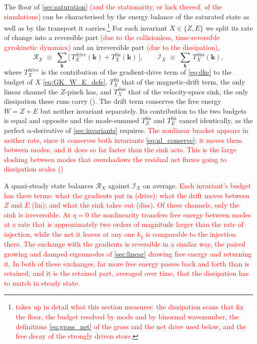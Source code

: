 \documentclass{jpp}
\renewcommand{\vec}[1]{\boldsymbol{#1}}
\newcommand{\vec}[1]{\boldsymbol{#1}}
\begin{document}
The floor of \cref{sec:saturation} \textcolor{red}{(and the stationarity, or lack thereof, of the simulations)} can be characterised by the energy balance of the saturated state as well as by the transport it carries.\footnote{\textcolor{red}{ takes up in detail what this section measures: the dissipation scans that fix the floor, the budget resolved by mode and by binormal wavenumber, the definitions \cref{eq:gross_net} of the gross and the net drive used below, and the free decay of the strongly driven store.}} For each invariant $X \in \{Z, E\}$ we split its rate of change into a reversible part \textcolor{red}{(due to the collisionless, time-reversible gyrokinetic dynamics)} and an irreversible part \textcolor{red}{(due to the dissipation)},
\begin{equation}\label{eq:rev_irr}
\mathcal{R}_X \;\equiv\; \sum_{\vec k}\bigl[\,T_X^\mathrm{drive}(\vec k) + T_X^\mathrm{lin}(\vec k)\,\bigr],
\qquad
\mathcal{I}_X \;\equiv\; \sum_{\vec k}\,T_X^\mathrm{diss}(\vec k),
\end{equation}
where $T_X^\mathrm{drive}$ is the contribution of the gradient-drive term of \cref{eq:dke} to the budget of $X$ \cref{eq:GK_W_E_defs}, $T_X^\mathrm{lin}$ that of the magnetic-drift term, the only linear channel the $Z$-pinch has, and $T_X^\mathrm{diss}$ that of the velocity-space sink, the only dissipation these runs carry (). The drift term conserves the free energy $W = Z + E$ but neither invariant separately. Its contribution to the two budgets is equal and opposite and the mode-summed $T_Z^\mathrm{lin}$ and $T_E^\mathrm{lin}$ cancel identically, as the perfect $\alpha$-derivative of \cref{sec:invariants} requires. \textcolor{red}{The nonlinear bracket appears in neither rate, since it conserves both invariants \cref{eq:nl_conserve}; it moves them between modes, and it does so far faster than the sink acts. This is the large sloshing between modes that overshadows the residual net fluxes going to dissipation scales ()} 

A quasi-steady state balances $\mathcal{R}_X$ against $\mathcal{I}_X$ on average. \textcolor{red}{Each invariant's budget has three terms: what the gradients put in (drive); what the drift moves between $Z$ and $E$ (lin); and what the sink takes out (diss). Of these channels, only the sink is irreversible. At $\eta = 0$ the nonlinearity transfers free energy between modes at a rate that is approximately two orders of magnitude larger than the rate of injection, while the net it leaves at any one $k_y$ is comparable to the injection there. The exchange with the gradients is reversible in a similar way, the paired growing and damped eigenmodes of \cref{sec:linear} drawing free energy and returning it. In both of these exchanges, far more free energy passes back and forth than is retained, and it is the retained part, averaged over time, that the dissipation has to match in steady state.} 
\end{document}
